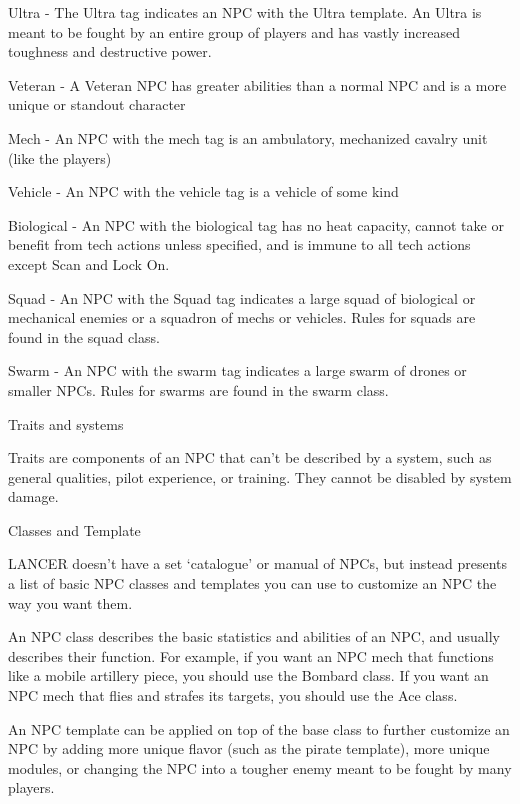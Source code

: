 Ultra - The Ultra tag indicates an NPC with the Ultra template. An Ultra is meant to be fought by  
an entire group of players and has vastly increased toughness and destructive power.
 
Veteran - A Veteran NPC has greater abilities than a normal NPC and is a more unique or  
standout character
 

Mech - An NPC with the mech tag is an ambulatory, mechanized cavalry unit (like the players)
 
Vehicle - An NPC with the vehicle tag is a vehicle of some kind
 
Biological - An NPC with the biological tag has no heat capacity, cannot take or benefit from  
tech actions unless specified, and is immune to all tech actions except Scan and Lock On.
 
Squad - An NPC with the Squad tag indicates a large squad of biological or mechanical enemies  
or a squadron of mechs or vehicles. Rules for squads are found in the squad class.
 
Swarm - An NPC with the swarm tag indicates a large swarm of drones or smaller NPCs. Rules  
for swarms are found in the swarm class.
 

                                           Traits and systems  

Traits are components of an NPC that can’t be described by a system, such as general qualities,  
pilot experience, or training. They cannot be disabled by system damage.
 

                                         Classes and Template  

LANCER doesn’t have a set ‘catalogue’ or manual of NPCs, but instead presents a list of basic  
NPC classes and templates you can use to customize an NPC the way you want them. 
 

An NPC class describes the basic statistics and abilities of an NPC, and usually describes their  
function. For example, if you want an NPC mech that functions like a mobile artillery piece, you  
should use the Bombard class. If you want an NPC mech that flies and strafes its targets, you  
should use the Ace class.
 

                                                                                                          


An NPC template can be applied on top of the base class to further customize an NPC by  
adding more unique flavor (such as the pirate template), more unique modules, or changing the  
NPC into a tougher enemy meant to be fought by many players.
 

